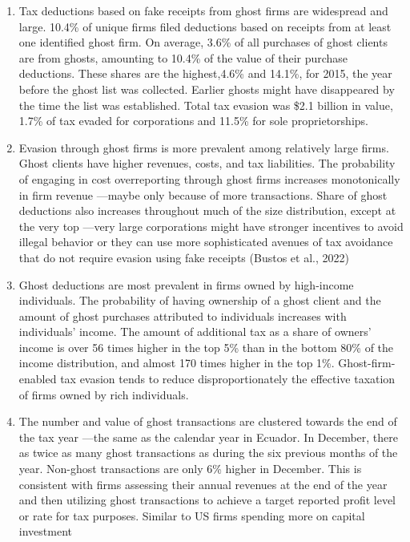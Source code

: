 \documentclass[
  12pt]{article}
\providecommand{\tightlist}{%
  \setlength{\itemsep}{0pt}\setlength{\parskip}{0pt}}\usepackage{longtable,booktabs,array}
\theoremstyle{definition}
\theoremstyle{remark}
\begin{document}
\begin{enumerate}
\def\labelenumi{\arabic{enumi}.}
\tightlist
\item
  Tax deductions based on fake receipts from ghost firms are widespread
  and large. 10.4\% of unique firms filed deductions based on receipts
  from at least one identified ghost firm. On average, 3.6\% of all
  purchases of ghost clients are from ghosts, amounting to 10.4\% of the
  value of their purchase deductions. These shares are the highest,4.6\%
  and 14.1\%, for 2015, the year before the ghost list was collected.
  Earlier ghosts might have disappeared by the time the list was
  established. Total tax evasion was \$2.1 billion in value, 1.7\% of
  tax evaded for corporations and 11.5\% for sole proprietorships.
\item
  Evasion through ghost firms is more prevalent among relatively large
  firms. Ghost clients have higher revenues, costs, and tax liabilities.
  The probability of engaging in cost overreporting through ghost firms
  increases monotonically in firm revenue ---maybe only because of more
  transactions. Share of ghost deductions also increases throughout much
  of the size distribution, except at the very top ---very large
  corporations might have stronger incentives to avoid illegal behavior
  or they can use more sophisticated avenues of tax avoidance that do
  not require evasion using fake receipts (Bustos et al., 2022)
\item
  Ghost deductions are most prevalent in firms owned by high-income
  individuals. The probability of having ownership of a ghost client and
  the amount of ghost purchases attributed to individuals increases with
  individuals' income. The amount of additional tax as a share of
  owners' income is over 56 times higher in the top 5\% than in the
  bottom 80\% of the income distribution, and almost 170 times higher in
  the top 1\%. Ghost-firm-enabled tax evasion tends to reduce
  disproportionately the effective taxation of firms owned by rich
  individuals.
\item
  The number and value of ghost transactions are clustered towards the
  end of the tax year ---the same as the calendar year in Ecuador. In
  December, there as twice as many ghost transactions as during the six
  previous months of the year. Non-ghost transactions are only 6\%
  higher in December. This is consistent with firms assessing their
  annual revenues at the end of the year and then utilizing ghost
  transactions to achieve a target reported profit level or rate for tax
  purposes. Similar to US firms spending more on capital investment

\end{enumerate}
\end{document}
